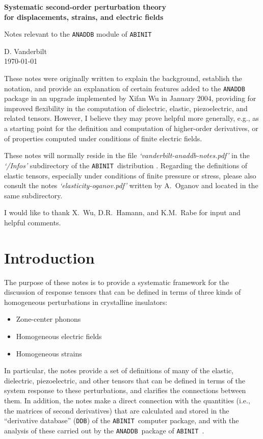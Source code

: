 \documentclass[11pt,fleqn]{article}
\def\ABINIT{{{\tt ABINIT}}}
\def\ANADDB{{\tt ANADDB}}
\def\DDB{{\tt DDB}}
\begin{document}
\begin{center}
{\Large\bf
Systematic second-order perturbation theory\\
\baselineskip 20pt
for displacements, strains, and electric fields
}
\large
\par\bigskip
Notes relevant to the {\tt ANADDB} module of {\tt ABINIT}
\par\medskip
D. Vanderbilt\\
\today
\end{center}


\bigskip
These notes were originally written to explain the background,
establish the notation, and provide an explanation of certain
features added to the \ANADDB\ \cite{abi} package in an upgrade implemented by
Xifan Wu in January 2004, providing for improved flexibility in the
computation of dielectric, elastic, piezoelectric, and related
tensors.  However, I believe they may prove helpful more generally,
e.g., as a starting point for the definition and computation of
higher-order derivatives, or of properties computed under conditions
of finite electric fields.

These notes will normally reside in the file {\sl `vanderbilt-anaddb-notes.pdf'}
in the {\sl `/Infos'} subdirectory of the \ABINIT\ distribution \cite{abi}.
Regarding the definitions of elastic tensors, especially under
conditions of finite pressure or stress, please also consult
the notes {\sl `elasticity-oganov.pdf'} \cite{oganov} written by A.~Oganov
and located in the same subdirectory.

I would like to thank X.~Wu, D.R.~Hamann, and K.M.~Rabe for input
and helpful comments.

\section{Introduction}

The purpose of these notes is to provide a systematic framework for
the discussion of response tensors that can be defined in terms of
three kinds of homogeneous perturbations in crystalline insulators:
\begin{itemize}
\item Zone-center phonons
\item Homogeneous electric fields
\item Homogeneous strains
\end{itemize}
In particular, the notes provide a set of definitions of many of
the elastic, dielectric, piezoelectric, and other tensors that
can be defined in terms of the system response to these
perturbations, and clarifies the connections between them.
In addition, the notes make a direct connection with the quantities
(i.e., the matrices of second derivatives) that are calculated and
stored in the ``derivative database'' (\DDB) of the
\ABINIT\ computer package, and with the analysis
of these carried out by the \ANADDB\ package of \ABINIT\
\cite{abi}.
\end{document}
